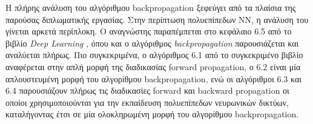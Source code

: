 Η πλήρης ανάλυση του αλγόριθμου backpropagation ξεφεύγει από τα πλαίσια
της παρούσας διπλωματικής εργασίας. Στην περίπτωση πολυεπίπεδων ΝΝ,
η ανάλυση του γίνεται αρκετά περίπλοκη. Ο αναγνώστης παραπέμπεται στο
κεφάλαιο 6.5 από το βιβλίο \emph{Deep Learning} \cite{Goodfellow-et-al-2016-Book}, όπου και ο αλγόριθμος
\emph{backpropagation} παρουσιάζεται και αναλύεται πλήρως. Πιο συγκεκριμένα,
ο αλγόριθμος 6.1 από το συγκεκριμένο βιβλίο αναφέρεται στην απλή μορφή της διαδικασίας
forward propagation, ο 6.2 είναι μία απλουστευμένη μορφή του αλγορίθμου backpropagation,
ενώ οι αλγόριθμοι 6.3 και 6.4 παρουσιάζουν πλήρως τις διαδικασίες forward και backward
propagation οι οποίοι χρησιμοποιούνται για την εκπαίδευση πολυεπίπεδων νευρωνικών δικτύων,
καταλήγοντας έτσι σε μία ολοκληρωμένη μορφή του αλγορίθμου backpropagation.

\makeatletter
\newcommand{\HEADER}[1]{\State\underline{\textsc{#1}}\begin{ALC@g}}
\newcommand{\ENDHEADER}{\end{ALC@g}}
\makeatother
\newcommand{\STATEI}[1]{\State
  \begin{tabular}{@{}p{\dimexpr \textwidth-\labelwidth}@{}}%
    \hangindent \algorithmicindent
    \hangafter 1
    #1
  \end{tabular}
}

